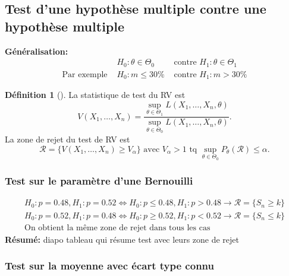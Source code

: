 \documentclass{article}
\theoremstyle{plain}%
\theoremstyle{definition}
\newtheorem{defn}{Définition}[section]
\theoremstyle{remark}
\begin{document}
\subsection{Test d'une hypothèse multiple contre une hypothèse multiple}

\textbf{Généralisation:} \begin{align*}
    &H_0: \theta \in \Theta _0 &\text{ contre } H_1: \theta \in \Theta _1 \\
    \text{Par exemple } &H_0: m \leq 30\% &\text{ contre } H_1: m > 30\%
\end{align*}

\begin{defn}[]
    La statistique de test du RV est 
    \[
        V(X_1, \dots, X_n) = \frac{\sup _{\theta \in \Theta _1} L(X_1, \dots, X_n, \theta )}{\sup _{\theta \in \Theta _0} L(X_1, \dots, X_n, \theta )}
    .\]
    La zone de rejet du test de RV est 
    \[
        \mathcal{R}= \{V(X_1, \dots, X_n) \geq V_\alpha \} \text{ avec } V_\alpha > 1 \text{ tq } \sup _{\theta \in \Theta _0} P_\theta (\mathcal{R}) \leq \alpha 
    .\]
\end{defn}

\subsubsection{Test sur le paramètre d'une Bernouilli}

\begin{align*}
    H_0: p= 0.48, H_1 : p=0.52 \Leftrightarrow H_0: p \leq 0.48, H_1: p > 0.48 \rightarrow \mathcal{R} = \{S_n \geq k\} \\
    H_0: p= 0.52, H_1 : p=0.48 \Leftrightarrow H_0: p \geq 0.52, H_1: p < 0.52 \rightarrow \mathcal{R} = \{S_n \leq k\} \\
    \text{On obtient la même zone de rejet dans tous les cas } 
\end{align*}
\textbf{Résumé: } diapo tableau qui résume test avec leurs zone de rejet

\subsubsection{Test sur la moyenne avec écart type connu}
\end{document}
